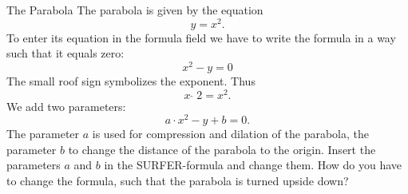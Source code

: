 \begin{surferPage}[Parabola]{The Parabola}
The parabola is given by the equation  \[y=x^2.\]
To enter its equation in the formula field we have to write the formula in a way such that it equals zero:
\[x^2-y=0\]
The small roof sign symbolizes the exponent. Thus 
\[ x  \,\hat{\ } \, 2 =x^2.\]
We add two parameters:
\[a \cdot x^2-y+b=0.\]
The parameter $a$ is used  for compression and dilation of the parabola, the parameter $b$ to change the distance of the parabola to the origin.
\newline
Insert the parameters $a$ and $b$ in the SURFER-formula and change them. How do you have to change the formula, such that the parabola is turned upside down?
\end{surferPage}
